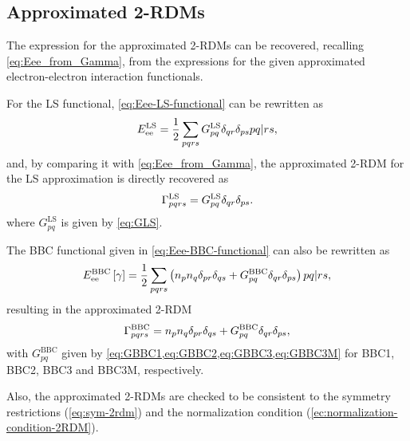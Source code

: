 \subsection{Approximated 2-RDMs}
\label{sec:approximated-2rdms}

The expression for the approximated 2-RDMs can be recovered, recalling
\cref{eq:Eee_from_Gamma}, from the expressions for the given approximated
electron-electron interaction functionals.

For the LS functional, \cref{eq:Eee-LS-functional} can be rewritten as 
\begin{equation}
    E_{\text{ee}}^{\text{LS}} =
    \frac{1}{2} \sum_{pqrs} G_{pq}^{\text{LS}}
    \delta_{qr} \delta_{ps} \PBraket{pq | rs} 
    ,
\end{equation}
and, by comparing it with \cref{eq:Eee_from_Gamma}, the approximated 2-RDM
for the LS approximation is directly recovered as 
\begin{equation}
    \Gamma_{pqrs}^{\text{LS}} =
    G_{pq}^{\text{LS}}
    \delta_{qr} \delta_{ps}
    .
\end{equation}
where $G_{pq}^{\text{LS}}$ is given by \cref{eq:GLS}.

The BBC functional given in \cref{eq:Eee-BBC-functional} can also be rewritten as
\begin{equation}
    E_{\text{ee}}^{\text{BBC}}\left[ \fordm \right] =
    \frac{1}{2} \sum_{pqrs} \left( 
        n_p n_q \delta_{pr} \delta_{qs} +
        G_{pq}^{\text{BBC}} \delta_{qr} \delta_{ps}
    \right) \PBraket{pq | rs}
    ,
\end{equation}
resulting in the approximated 2-RDM
\begin{equation}
    \Gamma_{pqrs}^{\text{BBC}} =
    n_p n_q \delta_{pr} \delta_{qs} +
    G_{pq}^{\text{BBC}} \delta_{qr} \delta_{ps}
    ,
\end{equation}
with $G_{pq}^{\text{BBC}}$ given by \cref{eq:GBBC1,eq:GBBC2,eq:GBBC3,eq:GBBC3M}
for BBC1, BBC2, BBC3 and BBC3M, respectively.

Also, the approximated 2-RDMs are checked to be consistent to the symmetry
restrictions (\cref{eq:sym-2rdm}) and the normalization condition
(\cref{ec:normalization-condition-2RDM}).
